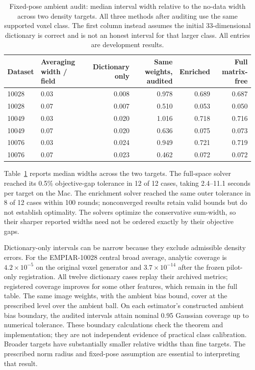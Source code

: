 \begin{table}[t]
\centering
\caption{Fixed-pose ambient audit: median interval width relative to the no-data width across two density targets. All three methods after auditing use the same supported voxel class. The first column instead assumes the initial 33-dimensional dictionary is correct and is not an honest interval for that larger class. All entries are development results.}
\label{tab:ambient}
\begin{tabular}{llrrrr}
\toprule
Dataset & Averaging width / field & Dictionary only & Same weights, audited & Enriched & Full matrix-free \\
\midrule
10028 & 0.03 & 0.008 & 0.978 & 0.689 & 0.687 \\
10028 & 0.07 & 0.007 & 0.510 & 0.053 & 0.050 \\
10049 & 0.03 & 0.020 & 1.016 & 0.718 & 0.716 \\
10049 & 0.07 & 0.020 & 0.636 & 0.075 & 0.073 \\
10076 & 0.03 & 0.024 & 0.949 & 0.721 & 0.719 \\
10076 & 0.07 & 0.023 & 0.462 & 0.072 & 0.072 \\
\bottomrule
\end{tabular}
\end{table}

Table~\ref{tab:ambient} reports median widths across the two targets. The full-space solver reached its 0.5\% objective-gap tolerance in 12 of 12 cases, taking 2.4--11.1 seconds per target on the Mac. The enrichment solver reached the same outer tolerance in 8 of 12 cases within 100 rounds; nonconverged results retain valid bounds but do not establish optimality. The solvers optimize the conservative sum-width, so their sharper reported widths need not be ordered exactly by their objective gaps.

Dictionary-only intervals can be narrow because they exclude admissible density errors. For the EMPIAR-10028 central broad average, analytic coverage is $4.2\times10^{-5}$ on the original voxel generator and $3.7\times10^{-14}$ after the frozen pilot-only registration. All twelve dictionary cases replay their archived metrics; registered coverage improves for some other features, which remain in the full table. The same image weights, with the ambient bias bound, cover at the prescribed level over the ambient ball. On each estimator's constructed ambient bias boundary, the audited intervals attain nominal 0.95 Gaussian coverage up to numerical tolerance. These boundary calculations check the theorem and implementation; they are not independent evidence of practical class calibration. Broader targets have substantially smaller relative widths than fine targets. The prescribed norm radius and fixed-pose assumption are essential to interpreting that result.
